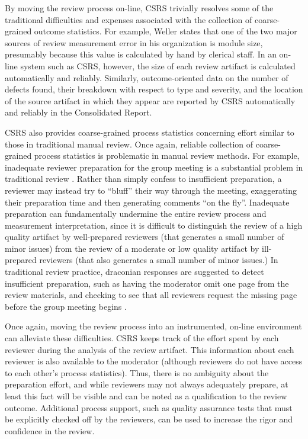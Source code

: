 By moving the review process on-line, CSRS trivially resolves some of
the traditional difficulties and expenses associated with the collection of
coarse-grained outcome statistics.  For example, Weller states
that one of the two major sources of review measurement error in his
organization is module size, presumably because this value is calculated by
hand by clerical staff.  In an on-line system such as CSRS, however, the
size of each review artifact is calculated automatically and reliably.
Similarly, outcome-oriented data on the number of defects found, their
breakdown with respect to type and severity, and the location of the source
artifact in which they appear are reported by CSRS automatically and
reliably in the Consolidated Report.  

CSRS also provides coarse-grained process statistics concerning effort
similar to those in traditional manual review.  Once again, reliable
collection of coarse-grained process statistics is problematic in manual
review methods.  For example, inadequate reviewer preparation for the group
meeting is a substantial problem in traditional review \cite{Freedman90}.
Rather than simply confess to insufficient preparation, a reviewer may
instead try to ``bluff'' their way through the meeting, exaggerating their
preparation time and then generating comments ``on the fly''.  Inadequate
preparation can fundamentally undermine the entire review process and
measurement interpretation, since it is difficult to distinguish the review
of a high quality artifact by well-prepared reviewers (that generates a
small number of minor issues) from the review of a moderate or low quality
artifact by ill-prepared reviewers (that also generates a small number of
minor issues.)  In traditional review practice, draconian responses are
suggested to detect insufficient preparation, such as having the moderator
omit one page from the review materials, and checking to see that all
reviewers request the missing page before the group meeting begins
\cite{Freedman90}.

Once again, moving the review process into an instrumented, on-line
environment can alleviate these difficulties.  CSRS keeps
track of the effort spent by each reviewer during the analysis of the
review artifact.  This information about each reviewer is also available to
the moderator (although reviewers do not have access to each other's
process statistics).  Thus, there is no ambiguity about the preparation
effort, and while reviewers may not always adequately prepare, at least
this fact will be visible and can be noted as a qualification to the review
outcome.  Additional process support, such as quality assurance tests that must be
explicitly checked off by the reviewers, can be used to increase the rigor
and confidence in the review. 


